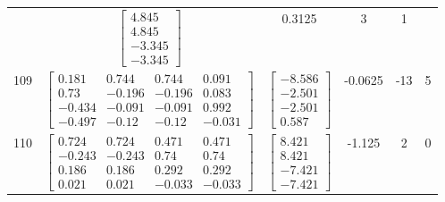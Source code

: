 \documentclass[a4paper,12pt]{article}
\begin{document}
\begin{tabular}{c c c c c c}
&
$\begin{bmatrix} 4.845 \\ 4.845 \\ -3.345 \\ -3.345 \end{bmatrix}$
&
0.3125
&
3
&
1
\\
109
&
$\begin{bmatrix} 0.181 & 0.744 & 0.744 & 0.091 \\ 0.73 & -0.196 & -0.196 & 0.083 \\ -0.434 & -0.091 & -0.091 & 0.992 \\ -0.497 & -0.12 & -0.12 & -0.031 \end{bmatrix}$
&
$\begin{bmatrix} -8.586 \\ -2.501 \\ -2.501 \\ 0.587 \end{bmatrix}$
&
-0.0625
&
-13
&
5
\\
110
&
$\begin{bmatrix} 0.724 & 0.724 & 0.471 & 0.471 \\ -0.243 & -0.243 & 0.74 & 0.74 \\ 0.186 & 0.186 & 0.292 & 0.292 \\ 0.021 & 0.021 & -0.033 & -0.033 \end{bmatrix}$
&
$\begin{bmatrix} 8.421 \\ 8.421 \\ -7.421 \\ -7.421 \end{bmatrix}$
&
-1.125
&
2
&
0
\\
\end{tabular} \egroup \newpage
\end{document}
